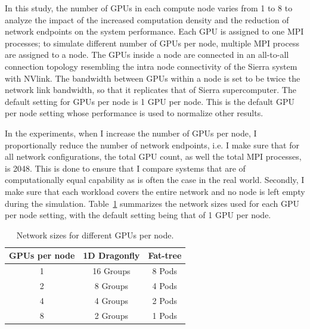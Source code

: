 
\vspace{0.08in}
In this study, the number of GPUs in each compute node varies from 1 to
8 to analyze the impact of the increased computation density and the reduction
of network endpoints on the system performance. Each GPU is assigned
to one MPI processes; to simulate different number of GPUs
per node, multiple MPI process are assigned to a node.
The GPUs inside a node are connected in an all-to-all connection topology resembling the intra node connectivity of the Sierra system with NVlink.
The bandwidth between GPUs within a node
is set to be twice the network link bandwidth, so that it replicates that of Sierra supercomputer.
The default setting for GPUs per node is 1 GPU per node. This is the default
GPU per node setting whose performance is used to normalize other results. 

In the experiments, when I increase the number of GPUs per node, I
proportionally reduce the number of network endpoints, i.e. I make sure that
for all network configurations, the total GPU count, as well the total MPI
  processes, is 2048. This is done
  to ensure that I compare systems that are of computationally equal capability
  as is often the case in the real world. Secondly, I make sure that each
  workload covers the entire network and no node is left empty during the
  simulation. 
  Table~\ref{table:configs} summarizes the network sizes used for each GPU
  per node setting, with the default setting being that of 1 GPU per node.  

\begin{table}[h]
       \centering
\caption{Network sizes for different GPUs per node.}
        \vspace{-1em}
        \begin{tabular}{ccc} \toprule
        \textbf{GPUs per node} & \textbf{1D Dragonfly} & \textbf{Fat-tree}\\ \midrule 
        1 & 16 Groups & 
        8 Pods \\
        
        2 &
        8 Groups & 
        4 Pods \\
        
        4 & 4 Groups & 
        2 Pods \\
        
        8 & 
        2 Groups & 
        1 Pods\\ \bottomrule
        \end{tabular}
\label{table:configs}
\end{table}


